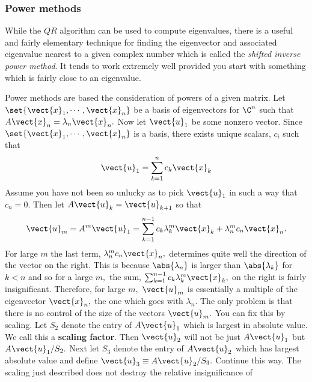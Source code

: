 \subsubsection{Power methods}

While the $QR$ algorithm can be used to compute eigenvalues, there is a useful and fairly elementary technique for
finding the eigenvector and associated eigenvalue nearest to a given complex number which
is called the {\em shifted inverse power method}. It tends to work extremely well provided you
start with something which is fairly close to an eigenvalue.

Power methods are based the consideration of powers of a given matrix. Let $
\set{
\vect{x}_{1},\cdots ,\vect{x}_{n}} $ be a basis of eigenvectors for $
\C^{n}$ such that $A\vect{x}_{n}=\lambda _{n}\vect{x}_{n}.$ Now let $
\vect{u}_{1}$ be some nonzero vector. Since $\set{\vect{x}_{1},\cdots ,\vect{x}_{n}} $ is a basis, there exists unique scalars, $c_{i}$ such that 
\begin{equation*}
\vect{u}_{1}=\sum_{k=1}^{n}c_{k}\vect{x}_{k}
\end{equation*}
Assume you have not been so unlucky as to pick $\vect{u}_{1}$ in such a way
that $c_{n}=0.$ Then let $A\vect{u}_{k}=\vect{u}_{k+1}$ so that 
\begin{equation}
\vect{u}_{m}=A^{m}\vect{u}_{1}=\sum_{k=1}^{n-1}c_{k}\lambda _{k}^{m}\vect{x}
_{k}+\lambda _{n}^{m}c_{n}\vect{x}_{n}.  \label{20-may-e1}
\end{equation}
For large $m$ the last term, $\lambda _{n}^{m}c_{n}\vect{x}_{n},$ determines
quite well the direction of the vector on the right. This is because $
\abs{\lambda _{n}}$ is larger than $\abs{\lambda
_{k}}$ for $k<n$ and so for a large $m,$ the sum, $\sum_{k=1}^{n-1}c_{k}\lambda _{k}^{m}\vect{x}_{k},$ on the right is fairly
insignificant. Therefore, for large $m,$ $\vect{u}_{m}$ is essentially a
multiple of the eigenvector $\vect{x}_{n},$ the one which goes with $\lambda
_{n}.$ The only problem is that there is no control of the size of the
vectors $\vect{u}_{m}.$ You can fix this by scaling. Let $S_{2}$ denote the
entry of $A\vect{u}_{1}$ which is largest in absolute value. We call this a 
 \textbf{scaling factor}. Then $\vect{u}_{2}$ will not be just $A\vect{u}_{1}$ but $A\vect{u}_{1}/S_{2}.$ Next
let $S_{3}$ denote the entry of $A\vect{u}_{2}$ which has largest absolute
value and define $\vect{u}_{3}\equiv A\vect{u}_{2}/S_{3}.$ Continue this way.
The scaling just described does not destroy the relative insignificance of

